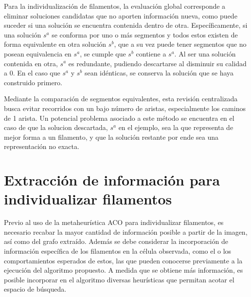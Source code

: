 Para la individualizaci\'on de filamentos, la evaluaci\'on global corresponde a eliminar soluciones candidatas que no aporten informaci\'on nueva, como puede suceder si una soluci\'on se encuentra contenida dentro de otra. Espec\'ificamente, si una soluci\'on $s^{a}$ se conforma por uno o m\'as segmentos y todos estos existen de forma equivalente en otra soluci\'on $s^{b}$, que a su vez puede tener segmentos que no posean equivalencia en $s^{a}$, se cumple que $s^{b}$ contiene a $s^{a}$. Al ser una soluci\'on contenida en otra, $s^{a}$ es redundante, pudiendo descartarse al disminuir su calidad a 0. En el caso que $s^{a}$ y $s^{b}$ sean id\'enticas, se conserva la soluci\'on que se haya construido primero. 
 
    

Mediante la comparaci\'on de segmentos equivalentes, esta revisi\'on centralizada busca evitar recorridos con un bajo n\'umero de aristas, especialmente los caminos de 1 arista. Un potencial problema asociado a este m\'etodo se encuentra en el caso de que la solucion descartada, $s^{a}$ en el ejemplo, sea la que representa de mejor forma a un filamento, y que la soluci\'on restante por ende sea una representaci\'on no exacta.


\section{Extracci\'on de informaci\'on para individualizar filamentos}
Previo al uso de la metaheur\'istica ACO para individualizar filamentos, es necesario recabar la mayor cantidad de informaci\'on posible a partir de la imagen, as\'i como del grafo extra\'ido. Adem\'as se debe considerar la incorporaci\'on de informaci\'on espec\'ifica de los filamentos en la c\'elula observada, como el o los comportamientos esperados de estos, las que pueden conocerse previamente a la ejecuci\'on del algoritmo propuesto. A medida que se obtiene m\'as informaci\'on, es posible incorporar en el algoritmo diversas heur\'isticas que permitan acotar el espacio de b\'usqueda.

